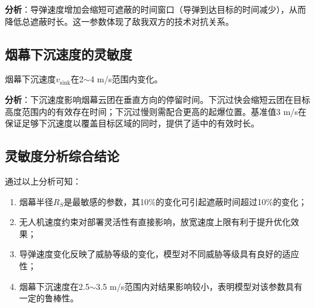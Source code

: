 \textbf{分析}：导弹速度增加会缩短可遮蔽的时间窗口（导弹到达目标的时间减少），从而降低总遮蔽时长。这一参数体现了敌我双方的技术对抗关系。

\subsection{烟幕下沉速度的灵敏度}

烟幕下沉速度$v_{\text{sink}}$在2$\sim$4 m/s范围内变化。

\textbf{分析}：下沉速度影响烟幕云团在垂直方向的停留时间。下沉过快会缩短云团在目标高度范围内的有效存在时间；下沉过慢则需配合更高的起爆位置。基准值3 m/s在保证足够下沉速度以覆盖目标区域的同时，提供了适中的有效时长。

\subsection{灵敏度分析综合结论}

通过以上分析可知：
\begin{enumerate}[label=(\arabic*)]
    \item 烟幕半径$R_S$是最敏感的参数，其10\%的变化可引起遮蔽时间超过10\%的变化；
    \item 无人机速度约束对部署灵活性有直接影响，放宽速度上限有利于提升优化效果；
    \item 导弹速度变化反映了威胁等级的变化，模型对不同威胁等级具有良好的适应性；
    \item 烟幕下沉速度在2.5$\sim$3.5 m/s范围内对结果影响较小，表明模型对该参数具有一定的鲁棒性。
\end{enumerate}
